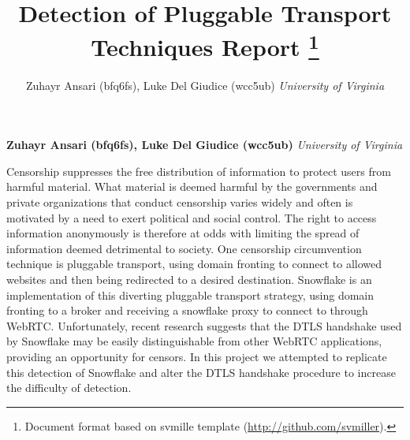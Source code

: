 \documentclass[11pt,]{article}
\title{Detection of Pluggable Transport Techniques
Report \thanks{Document format based on svmille template
(\url{http://github.com/svmiller}).}  }
\author{\Large Zuhayr Ansari (bfq6fs), Luke Del Giudice
(wcc5ub)\vspace{0.05in} \newline\normalsize\emph{University of
Virginia}  }
\date{}
\newcommand*{\authorfont}{\fontfamily{phv}\selectfont}
\renewenvironment{abstract}
 {{%
    \setlength{\leftmargin}{0mm}
    \setlength{\rightmargin}{\leftmargin}%
  }%
  \relax}
 {\endlist}
\begin{document}
	
%    


{%
\setlength{\parindent}{0pt}
\thispagestyle{plain}
{\fontsize{18}{20}\selectfont\raggedright 
\maketitle  %

}

{
   \vskip 13.5pt\relax \normalsize\fontsize{11}{12} 
\textbf{\authorfont Zuhayr Ansari (bfq6fs), Luke Del Giudice
(wcc5ub)} \hskip 15pt \emph{\small University of Virginia}   

}

}








\begin{abstract}

    \hbox{\vrule height .2pt width 39.14pc}

    \vskip 8.5pt %

\noindent Censorship suppresses the free distribution of information to
protect users from harmful material. What material is deemed harmful by
the governments and private organizations that conduct censorship varies
widely and often is motivated by a need to exert political and social
control. The right to access information anonymously is therefore at
odds with limiting the spread of information deemed detrimental to
society. One censorship circumvention technique is pluggable transport,
using domain fronting to connect to allowed websites and then being
redirected to a desired destination. Snowflake is an implementation of
this diverting pluggable transport strategy, using domain fronting to a
broker and receiving a snowflake proxy to connect to through WebRTC.
Unfortunately, recent research suggests that the DTLS handshake used by
Snowflake may be easily distinguishable from other WebRTC applications,
providing an opportunity for censors. In this project we attempted to
replicate this detection of Snowflake and alter the DTLS handshake
procedure to increase the difficulty of detection.


    \hbox{\vrule height .2pt width 39.14pc}


\end{abstract}
\end{document}
